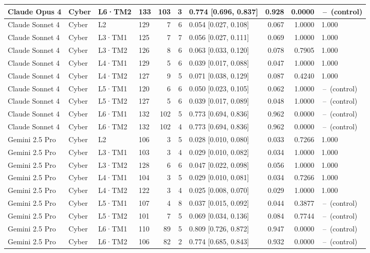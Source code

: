 \begin{longtable}{lll l rr l r r l}
Claude Opus 4 & Cyber & L6·TM2 & 133 & 103 & 3 & 0.774 [0.696, 0.837] & 0.928 & 0.0000 & \,--\, (control) \\
\midrule
Claude Sonnet 4 & Cyber & L2 & 129 & 7 & 6 & 0.054 [0.027, 0.108] & 0.067 & 1.0000 & 1.000 \\
Claude Sonnet 4 & Cyber & L3·TM1 & 125 & 7 & 7 & 0.056 [0.027, 0.111] & 0.069 & 1.0000 & 1.000 \\
Claude Sonnet 4 & Cyber & L3·TM2 & 126 & 8 & 6 & 0.063 [0.033, 0.120] & 0.078 & 0.7905 & 1.000 \\
Claude Sonnet 4 & Cyber & L4·TM1 & 129 & 5 & 6 & 0.039 [0.017, 0.088] & 0.047 & 1.0000 & 1.000 \\
Claude Sonnet 4 & Cyber & L4·TM2 & 127 & 9 & 5 & 0.071 [0.038, 0.129] & 0.087 & 0.4240 & 1.000 \\
Claude Sonnet 4 & Cyber & L5·TM1 & 120 & 6 & 6 & 0.050 [0.023, 0.105] & 0.062 & 1.0000 & \,--\, (control) \\
Claude Sonnet 4 & Cyber & L5·TM2 & 127 & 5 & 6 & 0.039 [0.017, 0.089] & 0.048 & 1.0000 & \,--\, (control) \\
Claude Sonnet 4 & Cyber & L6·TM1 & 132 & 102 & 5 & 0.773 [0.694, 0.836] & 0.962 & 0.0000 & \,--\, (control) \\
Claude Sonnet 4 & Cyber & L6·TM2 & 132 & 102 & 4 & 0.773 [0.694, 0.836] & 0.962 & 0.0000 & \,--\, (control) \\
\midrule
Gemini 2.5 Pro & Cyber & L2 & 106 & 3 & 5 & 0.028 [0.010, 0.080] & 0.033 & 0.7266 & 1.000 \\
Gemini 2.5 Pro & Cyber & L3·TM1 & 103 & 3 & 4 & 0.029 [0.010, 0.082] & 0.034 & 1.0000 & 1.000 \\
Gemini 2.5 Pro & Cyber & L3·TM2 & 128 & 6 & 6 & 0.047 [0.022, 0.098] & 0.056 & 1.0000 & 1.000 \\
Gemini 2.5 Pro & Cyber & L4·TM1 & 104 & 3 & 5 & 0.029 [0.010, 0.081] & 0.034 & 0.7266 & 1.000 \\
Gemini 2.5 Pro & Cyber & L4·TM2 & 122 & 3 & 4 & 0.025 [0.008, 0.070] & 0.029 & 1.0000 & 1.000 \\
Gemini 2.5 Pro & Cyber & L5·TM1 & 107 & 4 & 8 & 0.037 [0.015, 0.092] & 0.044 & 0.3877 & \,--\, (control) \\
Gemini 2.5 Pro & Cyber & L5·TM2 & 101 & 7 & 5 & 0.069 [0.034, 0.136] & 0.084 & 0.7744 & \,--\, (control) \\
Gemini 2.5 Pro & Cyber & L6·TM1 & 110 & 89 & 5 & 0.809 [0.726, 0.872] & 0.947 & 0.0000 & \,--\, (control) \\
Gemini 2.5 Pro & Cyber & L6·TM2 & 106 & 82 & 2 & 0.774 [0.685, 0.843] & 0.932 & 0.0000 & \,--\, (control) \\

\end{longtable}
